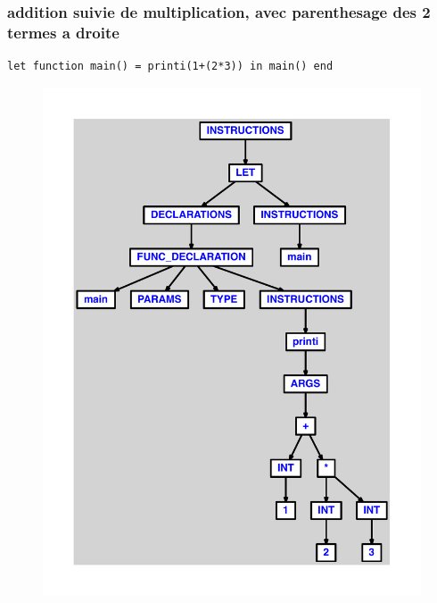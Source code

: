 \documentclass{article}
\begin{document}
\subsubsection{addition suivie de multiplication, avec parenthesage des 2 termes a droite}
\begin{lstlisting}
let function main() = printi(1+(2*3)) in main() end
\end{lstlisting}
\newpage
\begin{figure}[H]
\centering
\includegraphics[max width=\textwidth]{ast/ast_89.pdf}
\end{figure}
\newpage
\end{document}
